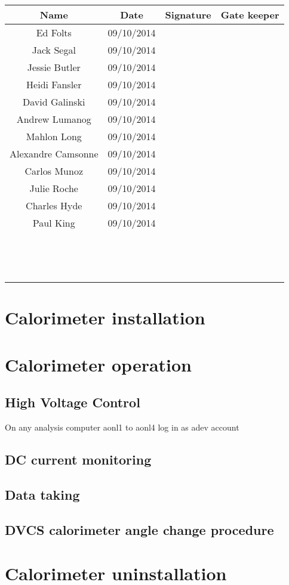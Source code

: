 \documentclass{article}
\begin{document}
\begin{tabular}{|c|c|c|c|}
\hline
Name & Date & Signature & Gate keeper\\
\hline
Ed Folts & 09/10/2014 & &\\
\hline
Jack Segal & 09/10/2014 & &\\
\hline
Jessie Butler & 09/10/2014 & &\\
\hline
Heidi Fansler& 09/10/2014 & &\\
\hline
David Galinski& 09/10/2014 & &\\
\hline
Andrew Lumanog& 09/10/2014 & &\\
\hline
Mahlon Long & 09/10/2014 & &\\
\hline
Alexandre Camsonne & 09/10/2014 & &\\
\hline
Carlos Munoz & 09/10/2014 & &\\
\hline
Julie Roche & 09/10/2014 & &\\
\hline
Charles Hyde & 09/10/2014 & &\\
\hline
Paul King  & 09/10/2014 & &\\
\hline
  &  & &\\
\hline
  & & &\\
\hline
  &  & &\\
\hline
  &  & &\\
\hline
  &  & &\\
\hline
  &  & &\\
\hline
  &  & &\\
\hline
  &  & &\\
\hline
  & & &\\
\hline
  &  & &\\
\hline
  &  & &\\
\hline
  &  & &\\
\hline
  &  & &\\
\hline
  &  & &\\
\hline
\end{tabular}

\section{Calorimeter installation}

\section{Calorimeter operation}
\subsection{High Voltage Control}
On any analysis computer aonl1 to aonl4 log in as adev account
\subsection{DC current monitoring}
\subsection{Data taking}
\subsection{DVCS calorimeter angle change procedure}
\section{Calorimeter uninstallation}
\end{document}
